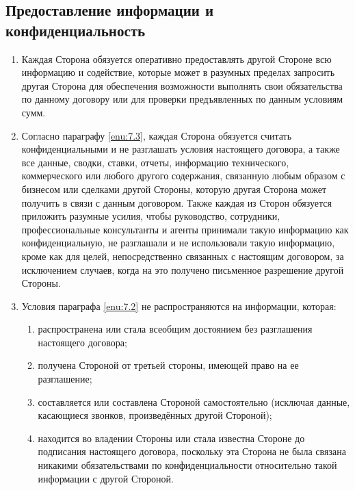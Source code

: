 \begin{Form}
    \section{Предоставление информации и конфиденциальность}\label{sec:7}
     \begin{enumerate}[label=\thesection.\arabic*.]
      \item Каждая Сторона  обязуется оперативно предоставлять другой Стороне  всю информацию и содействие, которые может в
            разумных пределах запросить другая Сторона для обеспечения возможности выполнять свои обязательства по данному
            договору или для проверки предъявленных по данным условиям сумм.\label{enu:7.2}
      \item Согласно параграфу \ref{enu:7.3}, каждая Сторона обязуется считать конфиденциальными и не разглашать
              условия настоящего договора, а также все данные, сводки, ставки, отчеты, информацию технического,
              коммерческого или любого другого содержания, связанную любым образом с бизнесом или сделками другой
              Стороны, которую другая Сторона может получить в связи с данным договором.
              Также каждая из Сторон обязуется приложить разумные усилия, чтобы руководство, сотрудники,
              профессиональные консультанты и агенты принимали такую информацию как конфиденциальную, не разглашали и не
              использовали такую информацию, кроме как для целей, непосредственно связанных с настоящим договором,
              за исключением случаев, когда на это получено письменное разрешение другой Стороны.
      \item Условия параграфа \ref{enu:7.2} не распространяются на информации, которая: \label{enu:7.3}
            \begin{enumerate}[label=\theenumi\arabic*.]
              \item распространена или стала всеобщим достоянием без разглашения настоящего договора;
              \item получена Стороной от третьей стороны, имеющей право на ее разглашение;
              \item составляется или составлена Стороной самостоятельно (исключая данные, касающиеся звонков, произведённых другой Стороной);
              \item находится во владении Стороны или стала известна Стороне до подписания настоящего договора, поскольку
                    эта Сторона не была связана никакими обязательствами по конфиденциальности относительно такой информации
                    с другой Стороной.

\end{enumerate}
\end{enumerate}
\end{Form}
